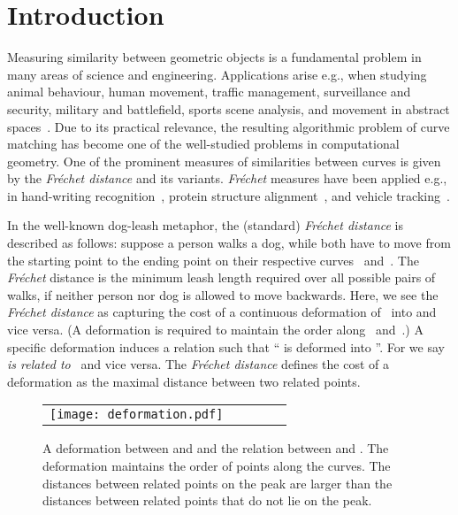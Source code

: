 \documentclass[a4paper,11pt]{article}
\begin{document}
\section{Introduction}\label{sec:intro}

	Measuring  similarity between geometric objects is a fundamental problem in many areas of science and engineering. Applications arise e.g., when studying animal behaviour, human movement, traffic management, surveillance and security, military and battlefield, sports scene analysis, and movement in abstract spaces~\cite{gudmundsson:movement,gudmundsson:gpu,gudmundsson:football}.  Due to its practical relevance, the resulting algorithmic problem of curve matching has become one of the well-studied problems in computational geometry.  One of the prominent measures of similarities between curves is given by the  \emph{Fr\'{e}chet distance} and its variants. \emph{Fr\'{e}chet}  measures have been applied e.g., in  hand-writing recognition~\cite{DBLP:conf/icdar/SriraghavendraKB07}, protein structure alignment~\cite{DBLP:journals/jbcb/JiangXZ08}, and vehicle tracking~\cite{wenk:vehicle}. 

	In the well-known dog-leash metaphor, the (standard) \emph{Fr\'{e}chet  distance} is described as follows:
suppose a person walks a dog, while both have to move from the starting point to the ending point on their respective curves~ and~. The \emph{Fr\'{e}chet}  distance is the minimum leash length required over all possible pairs of walks, if neither person nor dog is allowed to move backwards. Here, we see the  \emph{Fr\'{e}chet  distance} as capturing the cost of a continuous deformation of~ into  and vice versa. (A deformation is required to maintain the order along~ and~.) A specific deformation induces a relation  such that `` is deformed into ''. For  we say \emph{ is related to~} and vice versa. The \emph{Fr\'{e}chet distance} defines the cost of a deformation as the maximal distance between two related points. 

	
\begin{figure}[ht]
  \begin{center}
    \begin{tabular}{ccccc}
      \texttt{[image: deformation.pdf]} & &\\
\end{tabular}
  \end{center}
  \vspace*{-12pt}
  \caption{A deformation between  and  and the relation between  and . The deformation maintains the order of points along the curves. The distances between related points on the peak are larger than the distances between related points that do not lie  on the peak.
}
  \label{fig:deformationDistanceVSintegral}
\end{figure}
	
\end{document}
